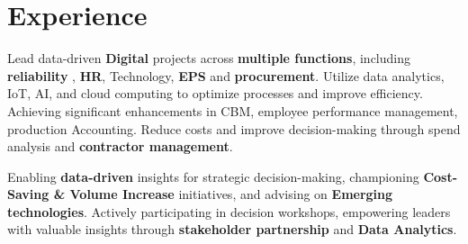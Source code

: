 \documentclass[]{deedy-resume-openfont}
\begin{document}
\hfill
\begin{minipage}[t]{0.66\textwidth}


\section{Experience}

\vspace{\topsep} %
\begin{tightemize}
\vspace{\topsep}
\item Lead data-driven \textbf{Digital} projects across \textbf{multiple  functions}, including \textbf{reliability} , \textbf{HR}, Technology, \textbf{EPS} and \textbf{procurement}. Utilize data analytics, IoT, AI, and cloud computing to optimize processes and improve efficiency. Achieving significant enhancements in CBM, employee performance management, production Accounting. Reduce costs and improve decision-making through spend analysis and \textbf{contractor management}.
\end{tightemize}
\sectionsep

\vspace{\topsep} %
\begin{tightemize}
\vspace{\topsep}

\item Enabling \textbf{data-driven} insights for strategic decision-making, championing \textbf{Cost-Saving \& Volume Increase} initiatives, and advising on \textbf{Emerging technologies}. Actively participating in decision workshops, empowering leaders with valuable insights through \textbf{stakeholder partnership} and \textbf{Data Analytics}.
\end{tightemize}
\sectionsep


\end{minipage}
\end{document}
